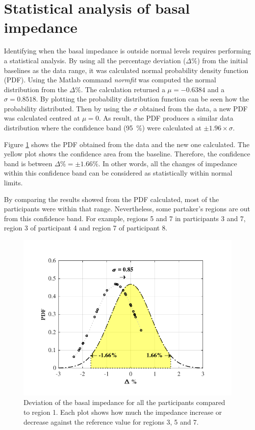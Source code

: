 \section{Statistical analysis of basal impedance}
\label{senction basal 4} 
Identifying when the basal impedance is outside normal levels requires performing a statistical analysis. By using all the percentage deviation ($\Delta \%$) from the initial baselines as the data range, it was calculated normal probability density function (PDF). Using the Matlab command \textit{normfit} was computed the normal distribution from the $\Delta \%$. The calculation returned a $\mu = -0.6384$ and a $\sigma = 0.8518$. By plotting the probability distribution function can be seen how the probability distributed. Then by using the $\sigma$ obtained from the data, a new PDF was calculated centred at $\mu = 0$. As result, the PDF produces a similar data distribution where the confidence band (\SI{95}{\percent}) were calculated at $\pm 1.96 \times\sigma$.

Figure \ref{fig:basal pdf} shows the PDF obtained from the data and the new one calculated. The yellow plot shows the confidence area from the baseline. Therefore, the confidence band is between $\Delta \% = \pm 1.66 \%$. In other words, all the changes of impedance within this confidence band can be considered as statistically within normal limits. 

By comparing the results showed from the PDF calculated, most of the participants were within that range. Nevertheless, some partaker's regions are out from this confidence band. For example, regions 5 and 7 in participants 3 and 7, region 3 of participant 4 and region 7 of participant 8.

\begin{figure}[!htbp]  %
	\centering
	\includegraphics[width=12cm,keepaspectratio, trim={0cm 0cm 0cm 0cm},clip]{figure_b_5}    
	\caption[Percentil change of baseline imepdance]{Deviation of the basal impedance for all the participants compared to region 1. Each plot shows how much the impedance increase or decrease against the reference value for regions 3, 5 and 7. }
	\label{fig:basal pdf} 
\end{figure}


